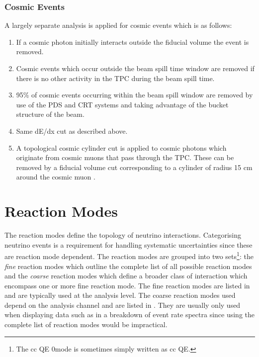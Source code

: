 \subsubsection*{Cosmic Events}
A largely separate analysis is applied for cosmic events which is as follows:
\begin{enumerate}
    \item  If a cosmic photon initially interacts outside the fiducial volume the event is removed.
    \item Cosmic events which occur outside the beam spill time window are removed if there is no other activity in the TPC during the beam spill time.
    \item 95\% of cosmic events occurring within the beam spill window are removed by use of the PDS and CRT systems and taking advantage of the bucket structure of the beam.
    \item Same dE/dx cut as described above. 
    \item A topological cosmic cylinder cut is applied to cosmic photons which originate from cosmic muons that pass through the TPC. These can be removed by a fiducial volume cut corresponding to a cylinder of radius 15 cm around the cosmic muon \cite{Dom's_thesis}. 
\end{enumerate}

\section{Reaction Modes}
The reaction modes define the topology of neutrino interactions. Categorising neutrino events is a requirement for handling systematic uncertainties since these are reaction mode dependent. The reaction modes are grouped into two sets\footnote{The \gls{cc} QE 0\pi mode is sometimes simply written as \gls{cc} QE.}: the \textit{fine} reaction modes which outline the complete list of all possible reaction modes and the \textit{coarse} reaction modes which define a broader class of interaction which encompass one or more fine reaction mode. The fine reaction modes are listed in  and are typically used at the analysis level. The coarse reaction modes used depend on the analysis channel and are listed in . They are usually only used when displaying data such as in a breakdown of event rate spectra since using the complete list of reaction modes would be impractical. 

